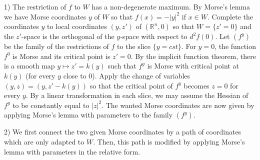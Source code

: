 \documentclass[12pt]{amsart}
\def\R{\mathbb{R}}
\def\nd{\noindent}
\begin{document}
\nd{\bf Proof.} 1) The restriction  of $f$
to $W$ has a non-degenerate maximum. By Morse's lemma we have Morse coordinates $y$ of $W$ 
so that $f(x)= -\vert y\vert^2$ if $x\in W$. Complete the coordinates $y$ to  local coordinates $(y,z')$ of 
$(\R^n,0)$ so that $W=\{z'=0\}$ and the $z'$-space  is the orthogonal of the 
$y$-space with respect to $d^2f(0)$. Let $\left(f^y\right)$ be
 the family  of the restrictions of $f$ to the slice $\{y=cst\}$. For $y=0$, the 
function $f^0$ is Morse and its  critical point is $z'=0$. By the implicit function theorem, there is a smooth 
map $y\mapsto z'=k(y)$ such that $f^y$ is Morse with critical point at $k(y)$ (for every $y$ close to $0$).
Apply  the change of variables $(y,z)= (y, z'-k(y))$ so that  the critical point of $f^y$ becomes
 $z=0$ for every
$y$. By  a linear transformation in each slice, we may assume the Hessian of $f^y$ to  be
constantly  equal to $\vert z\vert^2$. The wanted Morse coordinates are now 
given by applying Morse's lemma 
with parameters to the family $\left(f^y\right)$.

2) We first connect the two given Morse coordinates by a path of coordinates which are only adapted to
$W$. Then, this path is modified by applying Morse's lemma  with parameters in the relative form.
\end{document}
